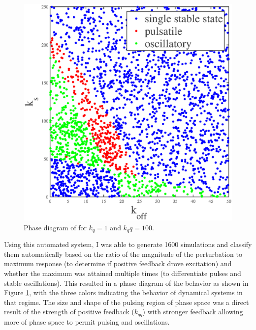\begin{figure}[h!]
	\centering
	\includegraphics[width=\hsize]{pulse/k_phase.eps}
	\caption{\label{fig:pulse_k_phase}  Phase diagram of for $k_q=1$ and $k_qq=100$.}
\end{figure}

Using this automated system, I was able to generate 1600 simulations and classify them automatically based on the ratio of the magnitude of the perturbation to maximum response (to determine if positive feedback drove excitation) and whether the maximum was attained multiple times (to differentiate pulses and stable oscillations).  This resulted in a phase diagram of the behavior as shown in Figure \ref{fig:pulse_k_phase}, with the three colors indicating the behavior of dynamical systems in that regime.  The size and shape of the pulsing region of phase space was a direct result of the strength of positive feedback ($k_{qq}$)  with stronger feedback allowing more of phase space to permit pulsing and oscillations.


